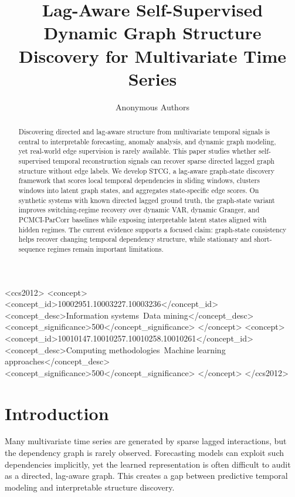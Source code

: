 \documentclass[sigconf,review,anonymous]{acmart}
\title{Lag-Aware Self-Supervised Dynamic Graph Structure Discovery for Multivariate Time Series}
\author{Anonymous Authors}
\affiliation{%
  \institution{Anonymous Institution}
  \city{Anonymous City}
  \country{Anonymous Country}}
\begin{document}
\begin{abstract}
Discovering directed and lag-aware structure from multivariate temporal signals is central to interpretable forecasting, anomaly analysis, and dynamic graph modeling, yet real-world edge supervision is rarely available.
This paper studies whether self-supervised temporal reconstruction signals can recover sparse directed lagged graph structure without edge labels.
We develop STCG, a lag-aware graph-state discovery framework that scores local temporal dependencies in sliding windows, clusters windows into latent graph states, and aggregates state-specific edge scores.
On synthetic systems with known directed lagged ground truth, the graph-state variant improves switching-regime recovery over dynamic VAR, dynamic Granger, and PCMCI-ParCorr baselines while exposing interpretable latent states aligned with hidden regimes.
The current evidence supports a focused claim: graph-state consistency helps recover changing temporal dependency structure, while stationary and short-sequence regimes remain important limitations.
\end{abstract}

\begin{CCSXML}
<ccs2012>
   <concept>
       <concept_id>10002951.10003227.10003236</concept_id>
       <concept_desc>Information systems~Data mining</concept_desc>
       <concept_significance>500</concept_significance>
   </concept>
   <concept>
       <concept_id>10010147.10010257.10010258.10010261</concept_id>
       <concept_desc>Computing methodologies~Machine learning approaches</concept_desc>
       <concept_significance>500</concept_significance>
   </concept>
</ccs2012>
\end{CCSXML}



\maketitle

\section{Introduction}

Many multivariate time series are generated by sparse lagged interactions, but the dependency graph is rarely observed.
Forecasting models can exploit such dependencies implicitly, yet the learned representation is often difficult to audit as a directed, lag-aware graph.
This creates a gap between predictive temporal modeling and interpretable structure discovery.
\end{document}
